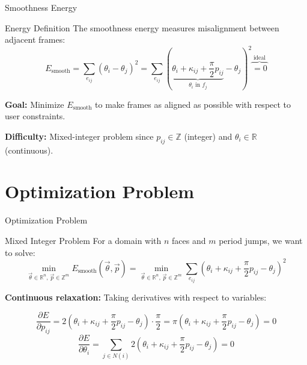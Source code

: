 \documentclass[aspectratio=169]{beamer}
\begin{document}
\begin{frame}{Smoothness Energy}
\begin{block}{Energy Definition}
The smoothness energy measures misalignment between adjacent frames:
\[
E_{\text{smooth}} = \sum_{e_{ij}} (\theta_i - \theta_j)^2 = \sum_{e_{ij}} ( \underbrace{\theta_i + \kappa_{ij} + \frac{\pi}{2} p_{ij}}_{\theta_i \text{ in } f_j} - \theta_j )^2 \overbrace{= 0}^{\text{ideal}}
\]
\end{block}

\vspace{0.3cm}

\textbf{Goal:} Minimize $E_{\text{smooth}}$ to make frames as aligned as possible with respect to user constraints.

\vspace{0.1cm}
\textbf{Difficulty:} Mixed-integer problem since $p_{ij} \in \mathbb{Z}$ (integer) and $\theta_i \in \mathbb{R}$ (continuous).


\end{frame}

\section{Optimization Problem}

\begin{frame}{Optimization Problem}
\begin{block}{Mixed Integer Problem}
For a domain with $n$ faces and $m$ period jumps, we want to solve:
\[
\min_{\vec{\theta} \in \mathbb{R}^n, \, \vec{p} \in \mathbb{Z}^m} E_{\text{smooth}}(\vec{\theta}, \vec{p}) = \min_{\vec{\theta} \in \mathbb{R}^n, \, \vec{p} \in \mathbb{Z}^m} \sum_{e_{ij}} \left( \theta_i + \kappa_{ij} + \frac{\pi}{2} p_{ij} - \theta_j \right)^2
\]
\end{block}

\vspace{0.2cm}
\textbf{Continuous relaxation:} Taking derivatives with respect to variables:

\[
    \frac{\partial E}{\partial p_{ij}} = 2\left( \theta_i + \kappa_{ij} + \frac{\pi}{2} p_{ij} - \theta_j \right) \cdot \frac{\pi}{2} = \pi\left( \theta_i + \kappa_{ij} + \frac{\pi}{2} p_{ij} - \theta_j \right) = 0
\]
\[
    \frac{\partial E}{\partial \theta_i} = \sum_{j \in N(i)} 2\left( \theta_i + \kappa_{ij} + \frac{\pi}{2} p_{ij} - \theta_j \right) = 0
\]
\end{frame}
\end{document}
